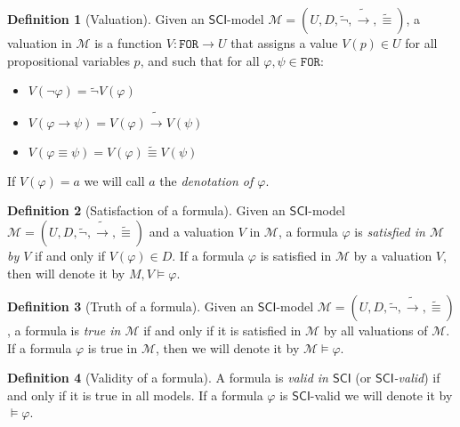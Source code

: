 \documentclass{article}
\theoremstyle{definition}
\newtheorem{definition}{Definition}[section]
\theoremstyle{definition}
\theoremstyle{definition}
\newcommand*{\id}{\equiv}
\newcommand*{\ra}{\rightarrow}
\newcommand*{\FOR}{\texttt{FOR}}
\newcommand{\SCI}{$\mathsf{SCI}$\xspace}
\begin{document}
\begin{definition}[Valuation]
    Given an \SCI-model $\mathcal{M} = (U, D, \tilde{\lnot}, \tilde{\ra}, \tilde{\id})$, a valuation in $\mathcal{M}$ is a function $V : \FOR \longrightarrow U$ that assigns a value $V(p) \in U$ for all propositional variables $p$, and such that for all $\varphi, \psi \in \FOR$:
    \begin{itemize}
        \item $V(\lnot \varphi) = \tilde{\lnot}V(\varphi)$
        \item $V(\varphi \ra \psi) = V(\varphi) \tilde{\ra} V(\psi)$
        \item $V(\varphi \id \psi) = V(\varphi) \tilde{\id} V(\psi)$
    \end{itemize}
    If $V(\varphi) = a$ we will call $a$ the \emph{denotation of $\varphi$}.
    \label{valuation}
\end{definition}

\begin{definition}[Satisfaction of a formula]
    Given an \SCI-model $\mathcal{M} = (U, D, \tilde{\lnot}, \tilde{\ra}, \tilde{\id})$ and a valuation $V$ in $\mathcal{M}$, a formula $\varphi$ is \emph{satisfied in $\mathcal{M}$ by $V$} if and only if $V(\varphi) \in D$. If a formula $\varphi$ is satisfied in $\mathcal{M}$ by a valuation $V$, then will denote it by $M, V \models \varphi$.
\end{definition}

\begin{definition}[Truth of a formula]
    Given an \SCI-model $\mathcal{M} = (U, D, \tilde{\lnot}, \tilde{\ra}, \tilde{\id})$, a formula is \emph{true in $\mathcal{M}$} if and only if it is satisfied in $\mathcal{M}$ by all valuations of $\mathcal{M}$. If a formula $\varphi$ is true in $\mathcal{M}$, then we will denote it by $\mathcal{M} \models \varphi$.
\end{definition}

\begin{definition}[Validity of a formula]
    A formula is \emph{valid in \SCI} (or \emph{\SCI-valid}) if and only if it is true in all models. If a formula $\varphi$ is \SCI-valid we will denote it by $ \models \varphi$.
\end{definition}
\end{document}
